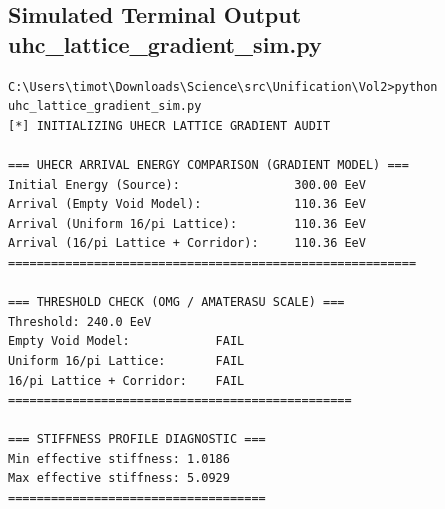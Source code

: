 \documentclass[11pt, letterpaper, openany]{book}
\begin{document}
\subsection*{Simulated Terminal Output uhc_lattice_gradient_sim.py}
\begin{lstlisting}[style=terminal]
C:\Users\timot\Downloads\Science\src\Unification\Vol2>python uhc_lattice_gradient_sim.py
[*] INITIALIZING UHECR LATTICE GRADIENT AUDIT

=== UHECR ARRIVAL ENERGY COMPARISON (GRADIENT MODEL) ===
Initial Energy (Source):                300.00 EeV
Arrival (Empty Void Model):             110.36 EeV
Arrival (Uniform 16/pi Lattice):        110.36 EeV
Arrival (16/pi Lattice + Corridor):     110.36 EeV
=========================================================

=== THRESHOLD CHECK (OMG / AMATERASU SCALE) ===
Threshold: 240.0 EeV
Empty Void Model:            FAIL
Uniform 16/pi Lattice:       FAIL
16/pi Lattice + Corridor:    FAIL
================================================

=== STIFFNESS PROFILE DIAGNOSTIC ===
Min effective stiffness: 1.0186
Max effective stiffness: 5.0929
====================================

\end{lstlisting}
\end{document}
